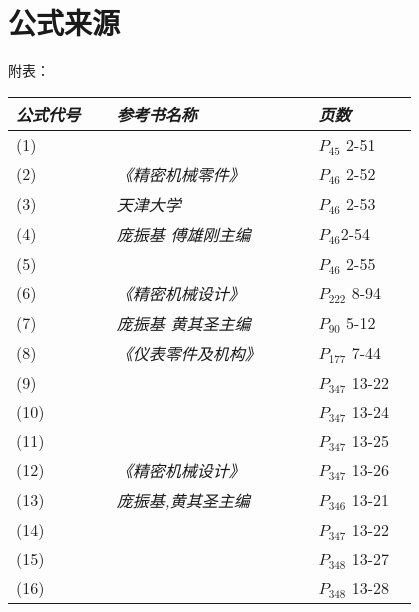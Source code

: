 \section{公式来源}
附表：
\begin{center}
\begin{tabular}{|>{\centering\arraybackslash}p{0.2\linewidth}|>{\centering\arraybackslash}p{0.4\linewidth}|>{\centering\arraybackslash}p{0.2\linewidth}|} \hline
\textit{公式代号}& \textit{参考书名称} & \textit{页数} \\ \hline
(1) &  & $P_{45}$ 2-51\\ \cline{1-1}\cline{3-3}
(2) & \textit{《精密机械零件》}& $P_{ 46}$ 2-52\\ \cline{1-1}\cline{3-3}
(3) &\textit{天津大学} & $P_{ 46}$ 2-53\\ \cline{1-1}\cline{3-3}
(4) & \textit{庞振基 傅雄刚主编}  & $P_{ 46}$2-54\\ \cline{1-1}\cline{3-3}
(5) &  & $P_{ 46}$ 2-55\\ \hline
(6) & \textit{《精密机械设计》} & $P_{ 222}$ 8-94\\ \cline{1-1}\cline{3-3}
(7) & \textit{庞振基 黄其圣主编} & $P_{ 90}$ 5-12\\ \hline
(8) & \textit{《仪表零件及机构》} & $P_{ 177}$ 7-44\\ \hline
(9) & & $P_{ 347}$  13-22\\ \cline{1-1}\cline{3-3}
(10) &  & $P_{ 347}$ 13-24\\ \cline{1-1}\cline{3-3}
(11) &  & $P_{ 347}$ 13-25\\ \cline{1-1}\cline{3-3}
(12) & \textit{《精密机械设计》}  & $P_{ 347}$ 13-26\\ \cline{1-1}\cline{3-3}
(13) & \textit{庞振基,黄其圣主编}& $P_{ 346}$ 13-21\\ \cline{1-1}\cline{3-3}
(14) &  & $P_{ 347}$ 13-22\\ \cline{1-1}\cline{3-3}
(15) & & $P_{ 348}$ 13-27\\ \cline{1-1}\cline{3-3}
(16) & & $P_{ 348}$ 13-28\\ \hline
\end{tabular}
\end{center}
